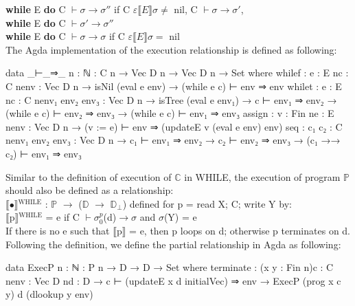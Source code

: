 \documentclass{jfrarticle}
\begin{document}
\textbf{while} E \textbf{do} C $\vdash\sigma \rightarrow \sigma''$ \hspace{0.95cm}if \hspace{0.2cm} C $\varepsilon \llbracket E \rrbracket \sigma \neq $ nil, C $\vdash\sigma \rightarrow \sigma'$,\\ \indent\hspace{7.5cm}\textbf{while} E \textbf{do} C $\vdash\sigma' \rightarrow \sigma''$\\
\textbf{while} E \textbf{do} C $\vdash\sigma \rightarrow \sigma$ \hspace{1.15cm}if \hspace{0.2cm} C $\varepsilon \llbracket E \rrbracket\sigma = $ nil\\
The Agda implementation of the execution relationship is defined as following:
\begin{code}[fontsize=\footnotesize]
data _⊢_⇒_ {n : ℕ} : C n → Vec D n  → Vec D n → Set where
  whilef : {e : E n}{c : C n}{env : Vec D n}
         → isNil (eval e env)
         → (while e c) ⊢ env ⇒ env
  whilet : {e : E n}{c : C n}{env₁ env₂ env₃ : Vec D n}
         → isTree (eval e env₁)
         → c ⊢ env₁ ⇒ env₂
         → (while e c) ⊢ env₂ ⇒ env₃
         → (while e c) ⊢ env₁ ⇒ env₃
  assign : {v : Fin n}{e : E n}{env : Vec D n}
         → (v := e) ⊢ env ⇒ (updateE v (eval e env) env)
  seq    : {c₁ c₂ : C n}{env₁ env₂ env₃ : Vec D n}
         → c₁ ⊢ env₁ ⇒ env₂
         → c₂ ⊢ env₂ ⇒ env₃
         → (c₁ →→ c₂) ⊢ env₁ ⇒ env₃

\end{code}
Similar to the definition of execution of $\mathds{C}$ in WHILE, the execution of program $\mathds{P}$ should also be defined as a relationship:\\
$\llbracket$$\bullet$$\rrbracket$$^{\mbox{WHILE}}$ : $\mathds{P}$ $\rightarrow$ ($\mathds{D}$ $\rightarrow$ $\mathds{D}$$_\perp$) defined for p = read X; C; write Y by:\\
$\llbracket$p$\rrbracket$$^{\mbox{WHILE}}$ = e if C $\vdash \sigma^p_0$(d)$ \rightarrow \sigma$ and $\sigma$(Y) = e\\
If there is no e such that $\llbracket$p$\rrbracket$ = e, then p loops on d; otherwise p terminates on d.\\
Following the definition, we define the partial relationship in Agda as following:
\begin{code}[fontsize=\small]
data ExecP {n : ℕ} : P n → D → D → Set where
  terminate : (x y : Fin n){c : C n}{env : Vec D n}{d : D}
            → c ⊢ (updateE x d initialVec) ⇒ env
            → ExecP (prog x c y) d (dlookup y env)
\end{code}
\end{document}
